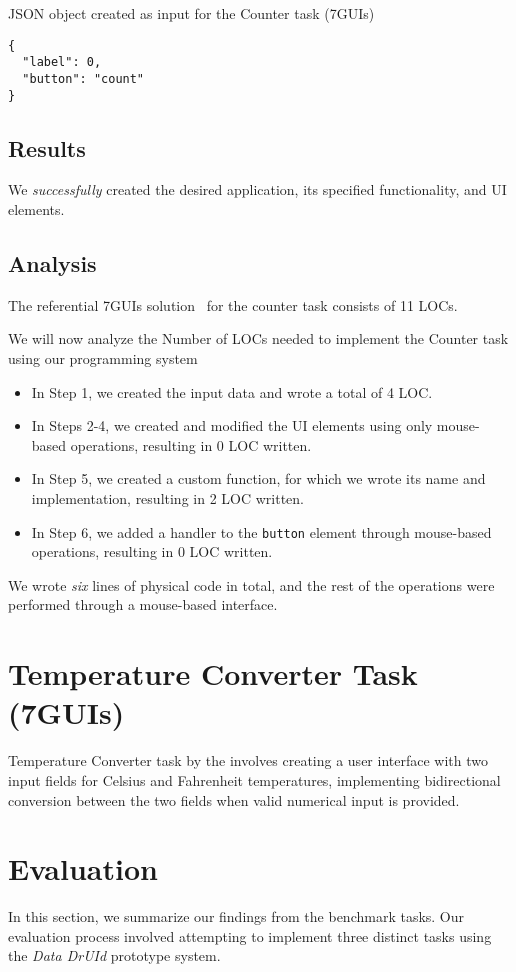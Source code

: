 \begin{listing}[htbp]
	\caption{JSON object created as input for the Counter task (7GUIs)}
	\label{fig:counter-json}
	\begin{lstlisting}
{
  "label": 0,
  "button": "count"
}
    \end{lstlisting}
\end{listing}

\subsection{Results}
We \emph{successfully} created the desired application, its specified functionality, and UI elements.

\subsection{Analysis}
The referential 7GUIs solution~\cite{7guis-React-TypeScript-MobX/src/app/guis/counter.tsx} for the counter task consists of 11 LOCs.

We will now analyze the Number of LOCs needed to implement the Counter task using our programming system
\begin{itemize}
	\item In Step 1, we created the input data and wrote a total of 4 LOC.
	\item   In Steps 2-4, we created and modified the UI elements using only mouse-based operations, resulting in 0 LOC written.
	\item   In Step 5, we created a custom function, for which we wrote its name and implementation, resulting in 2 LOC written.
	\item   In Step 6, we added a handler to the \texttt{button} element through mouse-based operations, resulting in 0 LOC written.
\end{itemize}
We wrote \emph{six} lines of physical code in total, and the rest of the operations were performed through a mouse-based interface.




\section{Temperature Converter Task (7GUIs)}
Temperature Converter task by the \citet{7GUIs-web} involves creating a user interface with two input fields for Celsius and Fahrenheit temperatures,
implementing bidirectional conversion between the two fields when valid numerical input is provided.


\section{Evaluation}
In this section, we summarize our findings from the benchmark tasks.
Our evaluation process involved attempting to implement three distinct tasks using the \emph{Data DrUId} prototype system.


